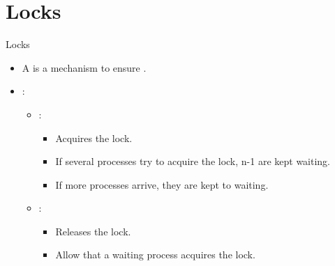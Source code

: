 \section{Locks}

\begin{frame}[t]{Locks}
\begin{itemize}
  \item A  is a mechanism to ensure .

  \item {}:
    \begin{itemize}

      \item {}:
        \begin{itemize}
          \item Acquires the lock.
          \item If several processes try to acquire the lock, n-1 are kept waiting.
          \item If more processes arrive, they are kept to waiting.
        \end{itemize}

      \item {}:
        \begin{itemize}
          \item Releases the lock.
          \item Allow that a waiting process acquires the lock.
        \end{itemize}
    \end{itemize}
\end{itemize}
\end{frame}

